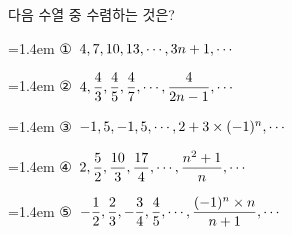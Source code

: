다음 수열 중 수렴하는 것은?
\par\medskip\par\noindent\hangindent=1.4em {\small ①}\ $4{,}\mkern3mu\mathopen{}7{,}\mkern3mu\mathopen{}10{,}\mkern3mu\mathopen{}13{,}\mkern3mu\mathopen{}\cdots{,}\mkern3mu\mathopen{}3n+1{,}\mkern3mu\mathopen{}\cdots$\par\noindent\hangindent=1.4em {\small ②}\ $4{,}\mkern3mu\mathopen{}\dfrac{4}{3}{,}\mkern3mu\mathopen{}\dfrac{4}{5}{,}\mkern3mu\mathopen{}\dfrac{4}{7}{,}\mkern3mu\mathopen{}\cdots{,}\mkern3mu\mathopen{}\dfrac{4}{2n-1}{,}\mkern3mu\mathopen{}\cdots$\par\noindent\hangindent=1.4em {\small ③}\ $-1{,}\mkern3mu\mathopen{}5{,}\mkern3mu\mathopen{}-1{,}\mkern3mu\mathopen{}5{,}\mkern3mu\mathopen{}\cdots{,}\mkern3mu\mathopen{}2+3\times(-1)^n{,}\mkern3mu\mathopen{}\cdots$\par\noindent\hangindent=1.4em {\small ④}\ $2{,}\mkern3mu\mathopen{}\dfrac{5}{2}{,}\mkern3mu\mathopen{}\dfrac{10}{3}{,}\mkern3mu\mathopen{}\dfrac{17}{4}{,}\mkern3mu\mathopen{}\cdots{,}\mkern3mu\mathopen{}\dfrac{n^2+1}{n}{,}\mkern3mu\mathopen{}\cdots$\par\noindent\hangindent=1.4em {\small ⑤}\ $-\dfrac{1}{2}{,}\mkern3mu\mathopen{}\dfrac{2}{3}{,}\mkern3mu\mathopen{}-\dfrac{3}{4}{,}\mkern3mu\mathopen{}\dfrac{4}{5}{,}\mkern3mu\mathopen{}\cdots{,}\mkern3mu\mathopen{}\dfrac{(-1)^n\times n}{n+1}{,}\mkern3mu\mathopen{}\cdots$\par\medskip
